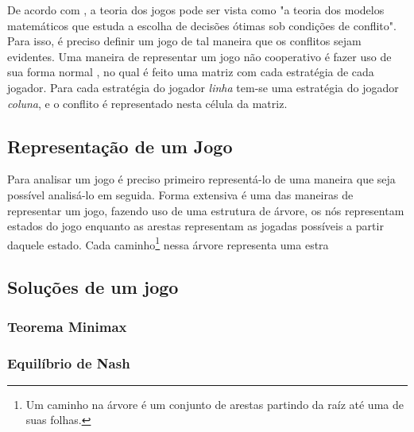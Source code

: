 De acordo com \cite{sartini_IIbienaldasbm}, a teoria dos jogos pode ser vista como "a teoria dos modelos matemáticos que estuda a escolha de decisões ótimas sob condições de conflito". Para isso, é preciso definir um jogo de tal maneira que os conflitos sejam evidentes. Uma maneira de representar um jogo não cooperativo é fazer uso de sua forma normal \cite{jones_1980}, no qual é feito uma matriz com cada estratégia de cada jogador. Para cada estratégia do jogador \emph{linha} tem-se uma estratégia do jogador \emph{coluna}, e o conflito é representado nesta célula da matriz.

\subsection{Representação de um Jogo}
\label{subsec:representacao-de-um-jogo}

Para analisar um jogo é preciso primeiro representá-lo de uma maneira que seja possível analisá-lo em seguida. Forma extensiva \cite{jones_1980} é uma das maneiras de representar um jogo, fazendo uso de uma estrutura de árvore, os nós representam estados do jogo enquanto as arestas representam as jogadas possíveis a partir daquele estado. Cada caminho\footnote{Um caminho na árvore é um conjunto de arestas partindo da raíz até uma de suas folhas.} nessa árvore representa uma estra



\subsection{Soluções de um jogo}
\label{sec:solucoes-de-um-jogo}

\subsubsection{Teorema Minimax}
\label{subsubsec:teorema-minimax}

\subsubsection{Equilíbrio de Nash}
\label{subsubsec:equilibrio-de-nash}
